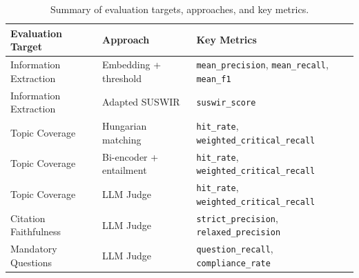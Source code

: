 \begin{table}[htbp]
    \centering
    \caption{Summary of evaluation targets, approaches, and key metrics.}
    \label{tab:evaluation_summary}
    \begin{tabular}{lll}
        \toprule
        \textbf{Evaluation Target} & \textbf{Approach} & \textbf{Key Metrics} \\
        \midrule
        Information Extraction & Embedding + threshold     & \texttt{mean\_precision}, \texttt{mean\_recall}, \texttt{mean\_f1} \\
        Information Extraction & Adapted SUSWIR            & \texttt{suswir\_score} \\
        \midrule
        Topic Coverage         & Hungarian matching        & \texttt{hit\_rate}, \texttt{weighted\_critical\_recall} \\
        Topic Coverage         & Bi-encoder + entailment   & \texttt{hit\_rate}, \texttt{weighted\_critical\_recall} \\
        Topic Coverage         & LLM Judge                 & \texttt{hit\_rate}, \texttt{weighted\_critical\_recall} \\
        \midrule
        Citation Faithfulness  & LLM Judge                 & \texttt{strict\_precision}, \texttt{relaxed\_precision} \\
        Mandatory Questions    & LLM Judge                 & \texttt{question\_recall}, \texttt{compliance\_rate} \\
        \bottomrule
    \end{tabular}
\end{table}